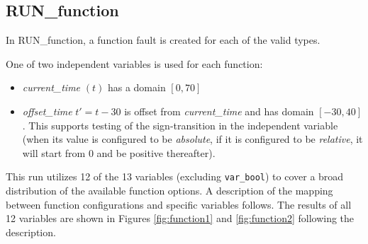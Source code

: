 \documentclass[11pt,fleqn]{report}
\begin{document}
\subsection{RUN\_function} \label{sec:verif:FM:function}
\par In RUN\_function, a function fault is created for each of the valid types.

One of two independent variables is used for each function:
\begin {itemize}
  \item \textit{current\_time} $(t)$ has a domain $[0,70]$
  \item \textit{offset\_time} $t'=t-30$ is offset from \textit{current\_time}
    and has domain $[-30,40]$. This supports testing of the sign-transition in
    the independent variable (when its value is configured to be
    \textit{absolute}, if it is configured to be \textit{relative}, it will
    start from $0$ and be positive thereafter).
\end{itemize}

This run utilizes 12 of the 13 variables (excluding \verb'var_bool')
to cover a broad distribution of the
available function options. A description of the mapping between function
configurations and specific variables follows. The results of all 12
variables are shown in Figures \ref{fig:function1} and \ref{fig:function2}
following the description.
\end{document}
